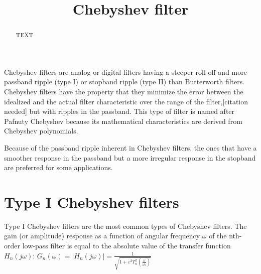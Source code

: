 \documentclass[journal abbreviation, manuscript]{copernicus}
\begin{document}
\title{Chebyshev filter}



\Author[]{}{}
\Author[]{}{}
\Author[]{}{}










\received{}
\pubdiscuss{} %
\revised{}
\accepted{}
\published{}




\maketitle



\begin{abstract}
TEXT
\end{abstract}



\introduction  %
Chebyshev filters are analog or digital filters having a steeper roll-off and more passband ripple (type I) or stopband ripple (type II) than Butterworth filters. Chebyshev filters have the property that they minimize the error between the idealized and the actual filter characteristic over the range of the filter,[citation needed] but with ripples in the passband. This type of filter is named after Pafnuty Chebyshev because its mathematical characteristics are derived from Chebyshev polynomials.

Because of the passband ripple inherent in Chebyshev filters, the ones that have a smoother response in the passband but a more irregular response in the stopband are preferred for some applications.



\section{Type I Chebyshev filters}
Type I Chebyshev filters are the most common types of Chebyshev filters. The gain (or amplitude) response as a function of angular frequency $\omega$ of the nth-order low-pass filter is equal to the absolute value of the transfer function $H_n(j\omega)$:
$G_n(\omega)=\left | H_n(j \omega) \right | = \frac{1}{\sqrt{1+\varepsilon^2 T_n^2\left(\frac{\omega}{\omega_0}\right)}}$
\end{document}
